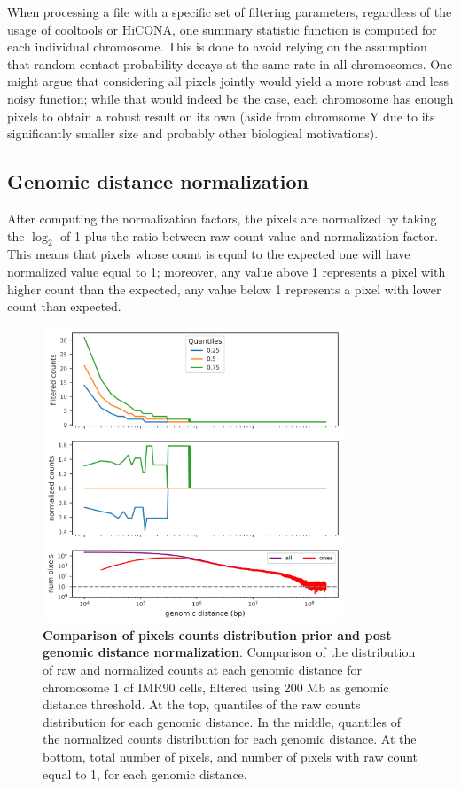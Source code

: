 When processing a file with a specific set of filtering parameters, regardless of the usage of cooltools or HiCONA, one summary statistic function is computed for each individual chromosome. This is done to avoid relying on the assumption that random contact probability decays at the same rate in all chromosomes. One might argue that considering all pixels jointly would yield a more robust and less noisy function; while that would indeed be the case, each chromosome has enough pixels to obtain a robust result on its own (aside from chromsome Y due to its significantly smaller size and probably other biological motivations).


\subsection{Genomic distance normalization}

After computing the normalization factors, the pixels are normalized by taking the $\log_2$ of 1 plus the ratio between raw count value and normalization factor. This means that pixels whose count is equal to the expected one will have normalized value equal to 1; moreover, any value above 1 represents a pixel with higher count than the expected, any value below 1 represents a pixel with lower count than expected. 

\begin{figure}[ht]
  \centering
  \includegraphics[width=0.8\textwidth]{normalization_stats.png}
  \caption{\textbf{Comparison of pixels counts distribution prior and post genomic distance normalization}. Comparison of the distribution of raw and normalized counts at each genomic distance for chromosome 1 of IMR90 cells, filtered using 200 Mb as genomic distance threshold. At the top, quantiles of the raw counts distribution for each genomic distance. In the middle, quantiles of the normalized counts distribution for each genomic distance. At the bottom, total number of pixels, and number of pixels with raw count equal to 1, for each genomic distance.}
  \label{fig:normstats}
\end{figure}

